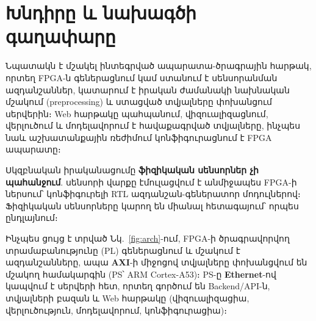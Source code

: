 \chapter{Խնդիրը և նախագծի գաղափարը}
\label{ch:problem}

Նպատակն է մշակել ինտեգրված ապարատա-ծրագրային հարթակ, որտեղ FPGA-ն գեներացնում կամ
ստանում է սենսորանման ազդանշաններ, կատարում է իրական ժամանակի նախնական մշակում
(preprocessing) և ստացված տվյալները փոխանցում սերվերին։ Web հարթակը պահպանում,
վիզուալիզացնում, վերլուծում և մոդելավորում է հավաքագրված տվյալները, ինչպես նաև
աշխատանքային ռեժիմում կոնֆիգուրացնում է FPGA ապարատը։


Սկզբնական իրականացումը \textbf{ֆիզիկական սենսորներ չի պահանջում}. սենսորի վարքը
էմուլացվում է անմիջապես FPGA-ի ներսում՝ կոնֆիգուրելի RTL ազդանշան-գեներատոր
մոդուլներով։ Ֆիզիկական սենսորները կարող են միանալ հետագայում՝ որպես ընդլայնում։


Ինչպես ցույց է տրված Նկ.~\ref{fig:arch}-ում, FPGA-ի ծրագրավորվող տրամաբանությունը
(PL) գեներացնում և մշակում է ազդանշանները, ապա \textbf{AXI}-ի միջոցով տվյալները
փոխանցվում են մշակող համակարգին (PS՝ ARM Cortex-A53)։ PS-ը \textbf{Ethernet}-ով
կապվում է սերվերի հետ, որտեղ գործում են Backend/API-ն, տվյալների բազան և Web
հարթակը (վիզուալիզացիա, վերլուծություն, մոդելավորում, կոնֆիգուրացիա)։
